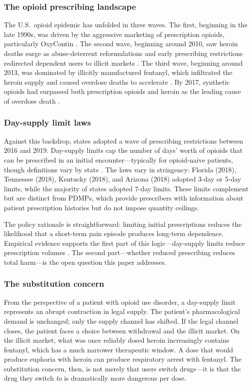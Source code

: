 \documentclass[12pt]{article}
\begin{document}
\subsubsection*{The opioid prescribing landscape} The U.S.\ opioid epidemic has unfolded in three waves. The first, beginning in the late 1990s, was driven by the aggressive marketing of prescription opioids, particularly OxyContin \citep{currie2019opioid}. The second wave, beginning around 2010, saw heroin deaths surge as abuse-deterrent reformulations and early prescribing restrictions redirected dependent users to illicit markets \citep{alpert2018supply, evans2019how}. The third wave, beginning around 2013, was dominated by illicitly manufactured fentanyl, which infiltrated the heroin supply and caused overdose deaths to accelerate \citep{pardo2019evolution}. By 2017, synthetic opioids had surpassed both prescription opioids and heroin as the leading cause of overdose death \citep{ruhm2019drivers}.

\subsubsection*{Day-supply limit laws} Against this backdrop, states adopted a wave of prescribing restrictions between 2016 and 2019. Day-supply limits cap the number of days' worth of opioids that can be prescribed in an initial encounter---typically for opioid-naive patients, though definitions vary by state \citep{davis2019laws}. The laws vary in stringency: Florida (2018), Tennessee (2018), Kentucky (2018), and Arizona (2018) adopted 3-day or 5-day limits, while the majority of states adopted 7-day limits. These limits complement but are distinct from PDMPs, which provide prescribers with information about patient prescription histories but do not impose quantity ceilings.

The policy rationale is straightforward: limiting initial prescriptions reduces the likelihood that a short-term pain episode produces long-term dependence. Empirical evidence supports the first part of this logic---day-supply limits reduce prescription volumes \citep{surratt2014reductions}. The second part---whether reduced prescribing reduces total harm---is the open question this paper addresses.

\subsubsection*{The substitution concern} From the perspective of a patient with opioid use disorder, a day-supply limit represents an abrupt contraction in legal supply. The patient's pharmacological demand is unchanged; only the supply channel has shifted. If the legal channel closes, the patient faces a choice between withdrawal and the illicit market. On the illicit market, what was once reliably dosed heroin increasingly contains fentanyl, which has a much narrower therapeutic window. A dose that would produce euphoria with heroin can produce respiratory arrest with fentanyl. The substitution concern, then, is not merely that users switch drugs---it is that the drug they switch \textit{to} is dramatically more dangerous per dose.
\end{document}
